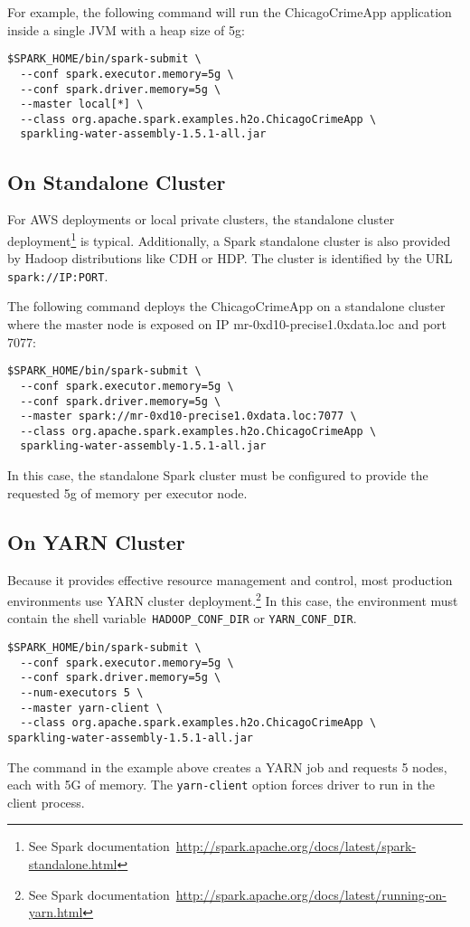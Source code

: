 For example, the following command will run the ChicagoCrimeApp application inside a single JVM with a heap size of 5g:
\begin{lstlisting}[style=Bash]
$SPARK_HOME/bin/spark-submit \ 
  --conf spark.executor.memory=5g \
  --conf spark.driver.memory=5g \
  --master local[*] \
  --class org.apache.spark.examples.h2o.ChicagoCrimeApp \
  sparkling-water-assembly-1.5.1-all.jar  
\end{lstlisting}


\subsection{On Standalone Cluster}
For AWS deployments or local private clusters, the standalone cluster deployment\footnote{See Spark documentation~\url{http://spark.apache.org/docs/latest/spark-standalone.html}} is typical. Additionally, a Spark standalone cluster is also provided by Hadoop distributions like CDH or HDP. The cluster is identified by the URL \texttt{spark://IP:PORT}.

The following command deploys the ChicagoCrimeApp on a standalone cluster where the master node is exposed on IP mr-0xd10-precise1.0xdata.loc and port 7077:

\begin{lstlisting}[style=Bash]
$SPARK_HOME/bin/spark-submit \ 
  --conf spark.executor.memory=5g \
  --conf spark.driver.memory=5g \
  --master spark://mr-0xd10-precise1.0xdata.loc:7077 \
  --class org.apache.spark.examples.h2o.ChicagoCrimeApp \
  sparkling-water-assembly-1.5.1-all.jar  
\end{lstlisting}

In this case, the standalone Spark cluster must be configured to provide the requested 5g of memory per executor node. 

\subsection{On YARN Cluster}
Because it provides effective resource management and control, most production environments use YARN cluster deployment.\footnote{See Spark documentation~\url{http://spark.apache.org/docs/latest/running-on-yarn.html}} 
In this case, the environment must contain the shell variable~\texttt{HADOOP\_CONF\_DIR} or \texttt{YARN\_CONF\_DIR}.

\begin{lstlisting}[style=Bash]
$SPARK_HOME/bin/spark-submit \ 
  --conf spark.executor.memory=5g \
  --conf spark.driver.memory=5g \
  --num-executors 5 \
  --master yarn-client \
  --class org.apache.spark.examples.h2o.ChicagoCrimeApp \
sparkling-water-assembly-1.5.1-all.jar  
\end{lstlisting}

The command in the example above creates a YARN job and requests 5 nodes, each with 5G of memory. The \texttt{yarn-client} option forces driver to run in the client process.
